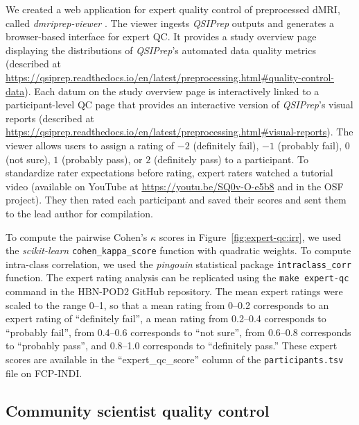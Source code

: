 \documentclass[9pt,lineno]{elife}
\begin{document}
We created a web application for expert quality control of preprocessed dMRI,
called \emph{dmriprep-viewer} \citep{richie-halford2021-viewer}. The viewer
ingests \emph{QSIPrep} outputs and generates a browser-based interface for
expert QC. It provides a study overview page displaying the distributions of
\emph{QSIPrep}'s automated data quality metrics (described at
\url{https://qsiprep.readthedocs.io/en/latest/preprocessing.html#quality-control-data}).
Each datum on the study overview page is interactively linked to a participant-level
QC page that provides an interactive version of \emph{QSIPrep}'s visual reports
(described at
\url{https://qsiprep.readthedocs.io/en/latest/preprocessing.html#visual-reports}).
The viewer allows users to assign a rating of $-2$ (definitely fail), $-1$
(probably fail), $0$ (not sure), $1$ (probably pass), or $2$ (definitely pass) to a
participant. To standardize rater expectations before rating, expert raters watched
a tutorial video (available on YouTube at \url{https://youtu.be/SQ0v-O-e5b8} and in the OSF project). They then rated each
participant and saved their scores and sent them to the lead author for compilation.

To compute the pairwise Cohen's $\kappa$ scores in Figure~\ref{fig:expert-qc:irr}, we
used the \emph{scikit-learn} \citep{scikit-learn} \texttt{cohen\_kappa\_score}
function with quadratic weights. To compute intra-class correlation, we used the
\emph{pingouin} statistical package \citep{vallat2018pingouin}
\texttt{intraclass\_corr} function. The expert rating analysis can be replicated
using the \texttt{make expert-qc} command in the HBN-POD2 GitHub repository.
The mean expert ratings were scaled to the range \numrange{0}{1}, so that a mean rating from \numrange{0}{0.2} corresponds to an expert rating of ``definitely fail'', a mean rating from \numrange{0.2}{0.4} corresponds to ``probably fail'', from \numrange{0.4}{0.6} corresponds to ``not sure'', from \numrange{0.6}{0.8} corresponds to ``probably pass'', and \numrange{0.8}{1.0} corresponds to ``definitely pass.'' These expert scores are available in the
``expert\_qc\_score'' column of the \texttt{participants.tsv} file on FCP-INDI.

\subsection{Community scientist quality control}
\end{document}

